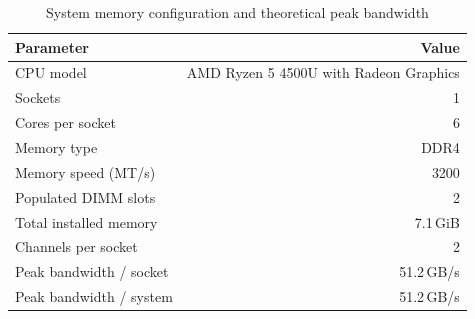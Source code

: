 \begin{table}[h]
    \centering
    \caption{System memory configuration and theoretical peak bandwidth}
    \label{tab:mem-bandwidth}
    \begin{tabular}{lr}
        \toprule
        \textbf{Parameter} & \textbf{Value} \\
        \midrule
        CPU model                & AMD Ryzen 5 4500U with Radeon Graphics \\
        Sockets                  & 1 \\
        Cores per socket         & 6 \\
        Memory type              & DDR4 \\
        Memory speed (MT/s)      & 3200 \\
        Populated DIMM slots     & 2 \\
        Total installed memory   & 7.1\,GiB \\
        Channels per socket      & 2 \\
        \midrule
        Peak bandwidth / socket  & 51.2\,GB/s \\
        Peak bandwidth / system  & 51.2\,GB/s \\
        \bottomrule
    \end{tabular}
\end{table}
